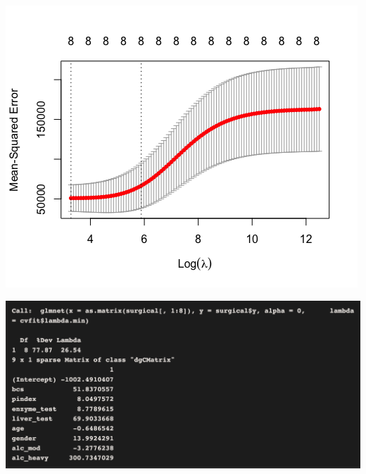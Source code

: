 \documentclass[compress]{beamer}
\newcommand{\sqBullet}[1]{  {\tiny \tiny \tiny \qBoxCol{#1!60}{ }} }
\begin{document}
\begin{frame}

\includegraphics[scale=.65]{figs8/CVfitRidge.png} \\


\end{frame}



%
%
%
%


\begin{frame}

\includegraphics[scale=.4]{figs8/Screen Shot RidgeResult.png} \\


\end{frame}
\end{document}
